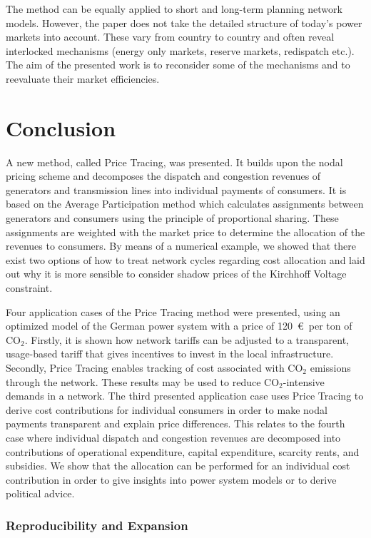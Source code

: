 \documentclass[11pt,twocolumn]{article}
\begin{document}
The method can be equally applied to short and long-term planning network models. However, the paper does not take the detailed structure of today's power markets into account. These vary from country to country and often reveal interlocked mechanisms (energy only markets, reserve markets, redispatch etc.). The aim of the presented work is to reconsider some of the mechanisms and  to reevaluate their market efficiencies.    


\section{Conclusion}
\label{sec:conclusions}

A new method, called Price Tracing, was presented. It builds upon the nodal pricing scheme and decomposes the dispatch and congestion revenues of generators and transmission lines into individual payments of consumers. It is based on the Average Participation method which calculates assignments between generators and consumers using the principle of proportional sharing. These assignments are weighted with the market price to determine the allocation of the revenues to consumers. By means of a numerical example, we showed that there exist two options of how to treat network cycles regarding cost allocation and laid out why it is more sensible to consider shadow prices of the Kirchhoff Voltage constraint.     

Four application cases of the Price Tracing method were presented, using an optimized model of the German power system with a price of 120~\euro\, per ton of CO$_2$. Firstly, it is shown how network tariffs can be adjusted to a transparent, usage-based tariff that gives incentives to invest in the local infrastructure. Secondly, Price Tracing enables tracking of cost associated with CO$_2$ emissions through the network. These results may be used to reduce CO$_2$-intensive demands in a network. The third presented application case uses Price Tracing to derive cost contributions for individual consumers in order to make nodal payments transparent and explain price differences. This relates to the fourth case where individual dispatch and congestion revenues are decomposed into contributions of operational expenditure, capital expenditure, scarcity rents, and subsidies. We show that the allocation can be performed for an individual cost contribution in order to give insights into power system models or to derive political advice.    

\subsubsection*{Reproducibility and Expansion}
\end{document}
